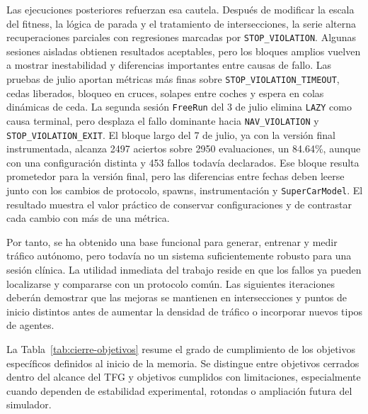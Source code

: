 Las ejecuciones posteriores refuerzan esa cautela. Después de modificar la escala del fitness, la lógica de parada y el tratamiento de intersecciones, la serie alterna recuperaciones parciales con regresiones marcadas por \texttt{STOP\_VIOLATION}. Algunas sesiones aisladas obtienen resultados aceptables, pero los bloques amplios vuelven a mostrar inestabilidad y diferencias importantes entre causas de fallo. Las pruebas de julio aportan métricas más finas sobre \texttt{STOP\_VIOLATION\_TIMEOUT}, cedas liberados, bloqueo en cruces, solapes entre coches y espera en colas dinámicas de ceda. La segunda sesión \texttt{FreeRun} del 3 de julio elimina \texttt{LAZY} como causa terminal, pero desplaza el fallo dominante hacia \texttt{NAV\_VIOLATION} y \texttt{STOP\_VIOLATION\_EXIT}. El bloque largo del 7 de julio, ya con la versión final instrumentada, alcanza 2497 aciertos sobre 2950 evaluaciones, un 84.64\%, aunque con una configuración distinta y 453 fallos todavía declarados. Ese bloque resulta prometedor para la versión final, pero las diferencias entre fechas deben leerse junto con los cambios de protocolo, spawns, instrumentación y \texttt{SuperCarModel}. El resultado muestra el valor práctico de conservar configuraciones y de contrastar cada cambio con más de una métrica.

Por tanto, se ha obtenido una base funcional para generar, entrenar y medir tráfico autónomo, pero todavía no un sistema suficientemente robusto para una sesión clínica. La utilidad inmediata del trabajo reside en que los fallos ya pueden localizarse y compararse con un protocolo común. Las siguientes iteraciones deberán demostrar que las mejoras se mantienen en intersecciones y puntos de inicio distintos antes de aumentar la densidad de tráfico o incorporar nuevos tipos de agentes.

La Tabla~\ref{tab:cierre-objetivos} resume el grado de cumplimiento de los objetivos específicos definidos al inicio de la memoria. Se distingue entre objetivos cerrados dentro del alcance del TFG y objetivos cumplidos con limitaciones, especialmente cuando dependen de estabilidad experimental, rotondas o ampliación futura del simulador.

